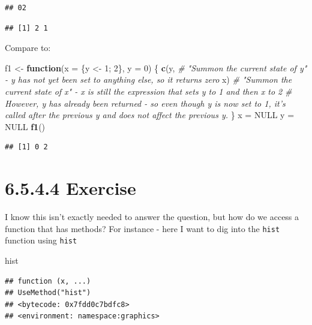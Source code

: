 \documentclass[]{book}
\newenvironment{Shaded}{\begin{snugshade}}{\end{snugshade}}
\newcommand{\CommentTok}[1]{\textcolor[rgb]{0.56,0.35,0.01}{\textit{#1}}}
\newcommand{\ControlFlowTok}[1]{\textcolor[rgb]{0.13,0.29,0.53}{\textbf{#1}}}
\newcommand{\DataTypeTok}[1]{\textcolor[rgb]{0.13,0.29,0.53}{#1}}
\newcommand{\DecValTok}[1]{\textcolor[rgb]{0.00,0.00,0.81}{#1}}
\newcommand{\KeywordTok}[1]{\textcolor[rgb]{0.13,0.29,0.53}{\textbf{#1}}}
\newcommand{\NormalTok}[1]{#1}
\newcommand{\OtherTok}[1]{\textcolor[rgb]{0.56,0.35,0.01}{#1}}
\newcommand{\StringTok}[1]{\textcolor[rgb]{0.31,0.60,0.02}{#1}}
\begin{document}
\begin{verbatim}
## 02
\end{verbatim}

\begin{verbatim}
## [1] 2 1
\end{verbatim}

Compare to:

\begin{Shaded}
\begin{Highlighting}[]
\NormalTok{f1 <-}\StringTok{ }\ControlFlowTok{function}\NormalTok{(}\DataTypeTok{x =}\NormalTok{ \{y <-}\StringTok{ }\DecValTok{1}\NormalTok{; }\DecValTok{2}\NormalTok{\}, }\DataTypeTok{y =} \DecValTok{0}\NormalTok{) \{}
  \KeywordTok{c}\NormalTok{(y, }\CommentTok{# "Summon the current state of y" - y has not yet been set to anything else, so it returns zero}
\NormalTok{    x) }\CommentTok{# "Summon the current state of x" - x is still the expression that sets y to 1 and then x to 2}
       \CommentTok{# However, y has already been returned - so even though y is now set to 1, it's called after the previous y and does not affect the previous y.}
\NormalTok{\}}
\NormalTok{x =}\StringTok{ }\OtherTok{NULL}
\NormalTok{y =}\StringTok{ }\OtherTok{NULL}
\KeywordTok{f1}\NormalTok{()}
\end{Highlighting}
\end{Shaded}

\begin{verbatim}
## [1] 0 2
\end{verbatim}

\hypertarget{exercise-3}{%
\section*{6.5.4.4 Exercise}\label{exercise-3}}

I know this isn't exactly needed to answer the question, but how do we access a function that has methods? For instance - here I want to dig into the \texttt{hist} function using \texttt{hist}

\begin{Shaded}
\begin{Highlighting}[]
\NormalTok{hist}
\end{Highlighting}
\end{Shaded}

\begin{verbatim}
## function (x, ...) 
## UseMethod("hist")
## <bytecode: 0x7fdd0c7bdfc8>
## <environment: namespace:graphics>
\end{verbatim}
\end{document}
